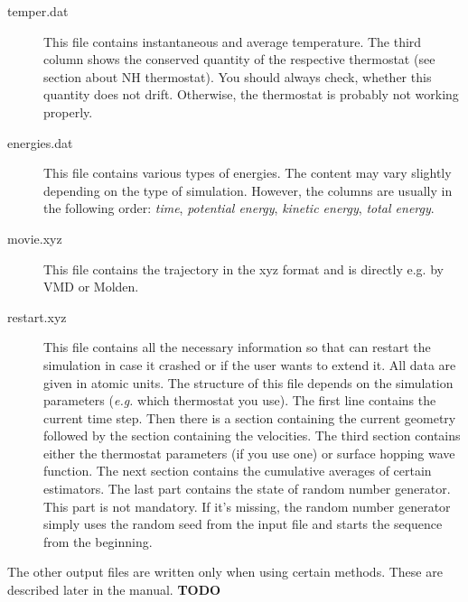 \begin{description}
\item[temper.dat] This file contains instantaneous and average temperature. The third column shows the conserved quantity of the respective thermostat (see section about NH thermostat). You should always check, whether this quantity does not drift. Otherwise, the thermostat
is probably not working properly.

\item[energies.dat] This file contains various types of energies. The content may vary slightly depending on the type of simulation. However, the columns are usually in the following order: \textit{time}, \textit{potential energy}, \textit{kinetic energy}, \textit{total energy}.

\item[movie.xyz] This file contains the trajectory in the xyz format and is directly e.g. by VMD or Molden.

\item[restart.xyz] This file contains all the necessary information so that \abin can restart the simulation in case it crashed or if the user wants to extend it. All data are given in atomic units. The structure of this file depends on the simulation parameters (\textit{e.g.} which thermostat you use). The first line contains the current time step. Then there is a section containing the current geometry followed by the section containing the velocities. The third section contains either the thermostat parameters (if you use one) or surface hopping wave function. The next section contains the cumulative averages of certain estimators. The last part contains the state of random number generator. This part is not mandatory. If it's missing, the random number generator simply uses the random seed from the input file and starts the sequence from the beginning.


\end{description}

The other output files are written only when using certain methods. These are described later in the manual. \textbf{TODO}

